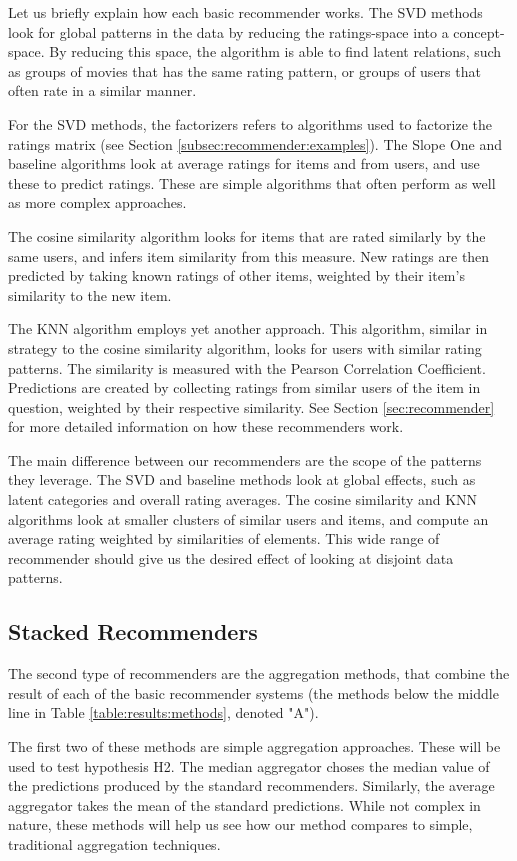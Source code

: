 Let us briefly explain how each basic recommender works.
The SVD methods look for global patterns in the data 
by reducing the ratings-space into a concept-space.
By reducing this space, the algorithm is able to find
latent relations, such as groups of movies that has the same
rating pattern, or groups of users that often rate in a similar manner.

For the SVD methods, the factorizers refers to algorithms used to factorize the ratings matrix
(see Section \ref{subsec:recommender:examples}).
The Slope One and baseline algorithms look at average
ratings for items and from users, and use these to predict ratings.
These are simple algorithms that often perform as well
as more complex approaches.

The cosine similarity algorithm looks for items that are rated
similarly by the same users, and infers item similarity from this measure.
New ratings are then predicted by taking known ratings of other items,
weighted by their item's similarity to the new item.

The KNN algorithm employs yet another approach. This algorithm,
similar in strategy to the cosine similarity algorithm,
looks for users with similar rating patterns.
The similarity is measured with the Pearson Correlation Coefficient.
Predictions are created by collecting ratings from similar users
of the item in question, weighted by their respective similarity.
See Section \ref{sec:recommender} for more 
detailed information on how these recommenders work. 

The main difference between our recommenders are the scope of the patterns they leverage.
The SVD and baseline methods look at global effects, such as latent categories
and overall rating averages.
The cosine similarity and KNN algorithms look at smaller clusters of similar
users and items, and compute an average rating weighted by 
similarities of elements.
This wide range of recommender should give us the desired
effect of looking at disjoint data patterns.


\subsection{Stacked Recommenders}

The second type of recommenders are the aggregation methods, 
that combine the result of each of the basic recommender systems
(the methods below the middle line in Table \ref{table:results:methods},
denoted "A").

The first two of these methods are simple aggregation approaches.
These will be used to test hypothesis H2.
The median aggregator choses the median value of the predictions
produced by the standard recommenders.
Similarly, the average aggregator takes the mean of the
standard predictions.
While not complex in nature, these methods
will help us see how our method compares to simple, traditional
aggregation techniques.

